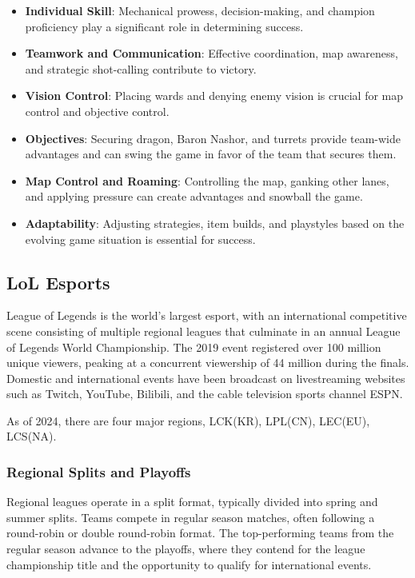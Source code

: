 \documentclass[11pt,a4paper,oneside]{report}
\begin{document}
\begin{itemize}
  \item \textbf{Individual Skill}: Mechanical prowess, decision-making, and champion proficiency play a significant role in determining success.
  \item \textbf{Teamwork and Communication}: Effective coordination, map awareness, and strategic shot-calling contribute to victory.
  \item \textbf{Vision Control}: Placing wards and denying enemy vision is crucial for map control and objective control.
  \item \textbf{Objectives}: Securing dragon, Baron Nashor, and turrets provide team-wide advantages and can swing the game in favor of the team that secures them.
  \item \textbf{Map Control and Roaming}: Controlling the map, ganking other lanes, and applying pressure can create advantages and snowball the game.
  \item \textbf{Adaptability}: Adjusting strategies, item builds, and playstyles based on the evolving game situation is essential for success.
\end{itemize}

\subsection{LoL Esports}
\label{sec:lol_esports}
League of Legends is the world's largest esport, with an international competitive scene consisting of multiple regional leagues that culminate in an annual League of Legends World Championship. The 2019 event registered over 100 million unique viewers, peaking at a concurrent viewership of 44 million during the finals. Domestic and international events have been broadcast on livestreaming websites such as Twitch, YouTube, Bilibili, and the cable television sports channel ESPN\cite{wikipedia-2024-lol}.

As of 2024, there are four major regions, LCK(KR), LPL(CN), LEC(EU), LCS(NA).

\subsubsection{Regional Splits and Playoffs}

Regional leagues operate in a split format, typically divided into spring and summer splits. Teams compete in regular season matches, often following a round-robin or double round-robin format. The top-performing teams from the regular season advance to the playoffs, where they contend for the league championship title and the opportunity to qualify for international events.
\end{document}
